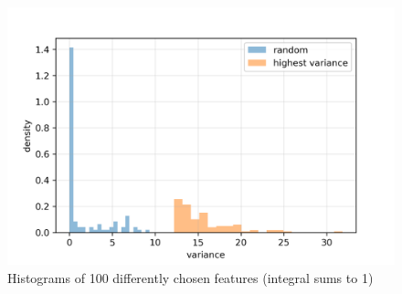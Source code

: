 \begin{figure}[h]
	\centering
	\includegraphics[width=0.7\linewidth]{problem_02/historams_variance}
	\caption{Histograms of 100 differently chosen features (integral sums to 1)}
	\label{fig:historams_variance}
\end{figure}